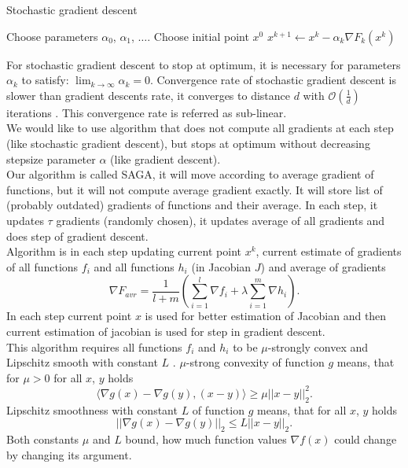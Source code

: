 \documentclass[11pt]{book}
\theoremstyle{definition}
\begin{document}
	\begin{algorithm}[H]
		\caption{Stochastic gradient descent \cite{SGD}}
		\label{alg:sgd}
		\begin{algorithmic}[1]
			\State Choose parameters $\alpha_0$, $\alpha_1$, $\dots$.
			\State Choose initial point $x^0$
			\State $x^{k+1} \leftarrow x^k - \alpha_k\nabla F_k(x^k) $
			\EndFor
		\end{algorithmic}
	\end{algorithm}
	
	For stochastic gradient descent to stop at optimum, it is necessary for parameters $\alpha_k$ to satisfy: $\lim_{k \rightarrow \infty}\alpha_k=0 $. Convergence rate of stochastic gradient descent is slower than gradient descents rate, it converges to distance $d$ with $\mathcal{O}(\frac{1}{d})$ iterations \cite{SGD}. This convergence rate is referred as sub-linear.\\
	
	We would like to use algorithm that does not compute all gradients at each step (like stochastic gradient descent), but stops at optimum without decreasing stepsize parameter $\alpha$ (like gradient descent).\\
	
	Our algorithm is called SAGA, it will move according to average gradient of functions, but it will not compute average gradient exactly. It will store list of (probably outdated) gradients of functions and their average. In each step, it updates $\tau$ gradients (randomly chosen), it updates average of all gradients and does step of gradient descent\cite{SAGA}.\\
	
	Algorithm is in each step updating current point $x^k$, current estimate of gradients of all functions $f_i$ and all functions $h_i$ (in Jacobian $J$) and average of gradients $$\nabla F_{avr}= \frac{1}{l+m}\left( \sum_{i=1}^l \nabla f_i + \lambda\sum_{i=1}^m \nabla h_i \right).$$ In each step current point $x$ is used for better estimation of Jacobian and then current estimation of jacobian is used for step in gradient descent.\\
	
	This algorithm requires all functions $f_i$ and $h_i$ to be $\mu$-strongly convex and Lipschitz smooth with constant $L$ \cite{SAGA}. $\mu$-strong convexity of function $g$ means, that for $\mu>0$ for all $x$, $y$ holds $$\langle \nabla g(x) - \nabla g(y), (x-y) \rangle \geq \mu ||x-y||_2^2. $$
	Lipschitz smoothness with constant $L$ of function $g$ means, that for all $x$, $y$ holds $$||\nabla g(x) - \nabla g(y)||_2 \leq L ||x-y||_2.$$ Both constants $\mu$ and $L$ bound, how much function values $\nabla f(x)$ could change by changing its argument.
	
\end{document}
